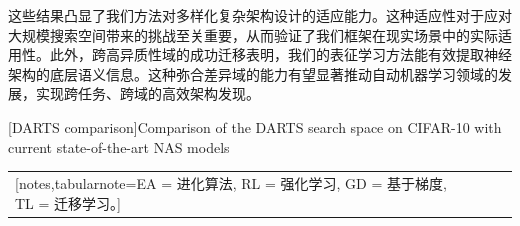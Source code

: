 \documentclass[../main.tex]{subfiles}
\begin{document}
这些结果凸显了我们方法对多样化复杂架构设计的适应能力。这种适应性对于应对大规模搜索空间带来的挑战至关重要，从而验证了我们框架在现实场景中的实际适用性。此外，跨高异质性域的成功迁移表明，我们的表征学习方法能有效提取神经架构的底层语义信息。这种弥合差异域的能力有望显著推动自动机器学习领域的发展，实现跨任务、跨域的高效架构发现。

\begin{table}
	\centering
	[DARTS comparison]{Comparison of the DARTS search space on CIFAR-10 with current state-of-the-art NAS models}\label{tab:transfer-result-301}

	\small\begin{NiceTabularX}{\textwidth}{p{9em}X[c]X[c]l}[notes,tabularnote={EA = 进化算法, RL = 强化学习, GD = 基于梯度, TL = 迁移学习。}]


\end{NiceTabularX}
\end{table}
\end{document}
